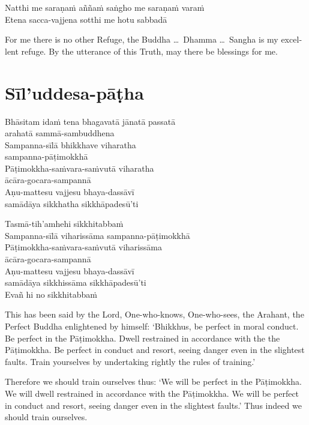 Natthi me saraṇaṁ aññaṁ saṅgho me saraṇaṁ varaṁ\\
Etena sacca-vajjena sotthi me hotu sabbadā


\begin{english}
  For me there is no other Refuge, the Buddha \ldots\ Dhamma \ldots\ Sangha is
  my excellent refuge. By the utterance of this Truth, may there be blessings
  for me.
\end{english}

\section{Sīl'uddesa-pāṭha}

\begin{leader}
\end{leader}


Bhāsitam idaṁ tena bhagavatā jānatā passatā\\\vin arahatā sammā-sambuddhena\\
Sampanna-sīlā bhikkhave viharatha\\\vin sampanna-pāṭimokkhā\\
Pāṭimokkha-saṁvara-saṁvutā viharatha\\\vin ācāra-gocara-sampannā\\
Aṇu-mattesu vajjesu bhaya-dassāvī\\\vin samādāya sikkhatha sikkhāpadesū'ti

Tasmā-tih'amhehi sikkhitabbaṁ\\
Sampanna-sīlā viharissāma sampanna-pāṭimokkhā\\
Pāṭimokkha-saṁvara-saṁvutā viharissāma\\\vin ācāra-gocara-sampannā\\
Aṇu-mattesu vajjesu bhaya-dassāvī\\\vin samādāya sikkhissāma sikkhāpadesū'ti\\
Evañ hi no sikkhitabbaṁ


\begin{english}
  \setlength{\parskip}{8pt}%
  This has been said by the Lord, One-who-knows, One-who-sees, the Arahant, the
  Perfect Buddha enlightened by himself: `Bhikkhus, be perfect in moral
  conduct. Be perfect in the Pāṭimokkha. Dwell restrained in accordance with the
  the Pāṭimokkha. Be perfect in conduct and resort, seeing danger even in the
  slightest faults. Train yourselves by undertaking rightly the rules of training.'

  Therefore we should train ourselves thus: `We will be perfect in the
  Pāṭimokkha. We will dwell restrained in accordance with the Pāṭimokkha. We
  will be perfect in conduct and resort, seeing danger even in the slightest
  faults.' Thus indeed we should train ourselves.
\end{english}

